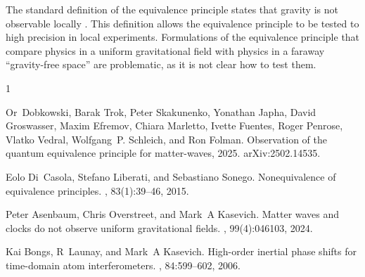 \documentclass[aps,prl,reprint,onecolumn,nofootinbib,groupedaddress]{revtex4-2}
\begin{document}
The standard definition of the equivalence principle states that gravity is not observable locally \cite{DiCasola2015}.  This definition allows the equivalence principle to be tested to high precision in local experiments.  Formulations of the equivalence principle that compare physics in a uniform gravitational field with physics in a faraway ``gravity-free space'' are problematic, as it is not clear how to test them.  
\begin{thebibliography}{1}

Or~Dobkowski, Barak Trok, Peter Skakunenko, Yonathan Japha, David Groswasser, Maxim Efremov, Chiara Marletto, Ivette Fuentes, Roger Penrose, Vlatko Vedral, Wolfgang~P. Schleich, and Ron Folman.
\newblock Observation of the quantum equivalence principle for matter-waves, 2025.
\newblock arXiv:2502.14535.

Eolo Di~Casola, Stefano Liberati, and Sebastiano Sonego.
\newblock Nonequivalence of equivalence principles.
, 83(1):39--46, 2015.

Peter Asenbaum, Chris Overstreet, and Mark~A Kasevich.
\newblock Matter waves and clocks do not observe uniform gravitational fields.
, 99(4):046103, 2024.

Kai Bongs, R~Launay, and Mark~A Kasevich.
\newblock High-order inertial phase shifts for time-domain atom interferometers.
, 84:599--602, 2006.

\end{thebibliography}

%
%
\end{document}
